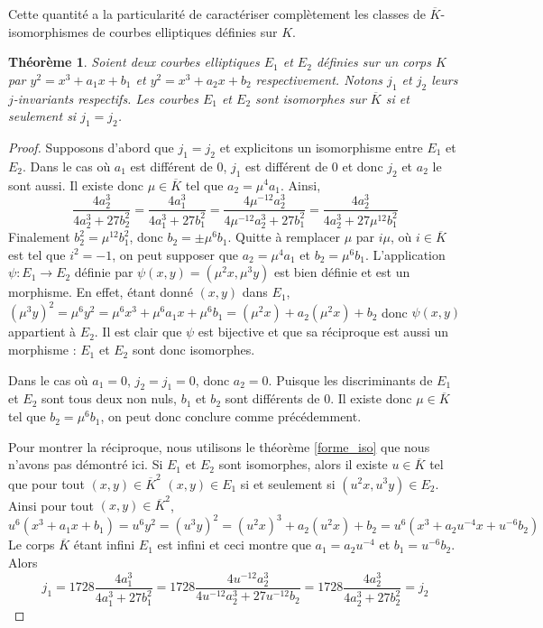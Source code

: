 \documentclass{article}
\theoremstyle{plain}%
\newtheorem{thm}{Théorème}[section]
\theoremstyle{definition}%
\newcommand{\ol}{\overline}
\begin{document}
Cette quantité a la particularité de caractériser complètement les classes de $\ol K$-isomorphismes de courbes elliptiques définies sur $K$.

\begin{thm}
Soient deux courbes elliptiques $E_1$ et $E_2$ définies sur un corps $K$ par $y^2 = x^3 + a_1x+ b_1$ et $y^2 = x^3 + a_2x + b_2$ respectivement. Notons $j_1$ et $j_2$ leurs $j$-invariants respectifs. Les courbes $E_1$ et $E_2$ sont isomorphes sur $\ol K$ si et seulement si $j_1 = j_2$.
\end{thm}

\begin{proof}
  Supposons d'abord que $j_1 = j_2$ et explicitons un isomorphisme entre $E_1$ et $E_2$. Dans le cas où $a_1$ est différent de $0$, $j_1$ est différent de $0$ et donc $j_2$ et $a_2$ le sont aussi. Il existe donc $\mu \in \ol K$ tel que $a_2 = \mu^4 a_1$. Ainsi,
  $$ \frac{4a_2^3}{4a_2^3 +27b_2^2} = \frac{4a_1^3}{4a_1^3+27b_1^2} =\frac{4\mu^{-12}a_2^3}{4\mu^{-12}a_2^3 + 27b_1^2} = \frac{4a_2^3}{4a_2^3+ 27\mu^{12} b_1^2}$$
  Finalement $b_2^2 = \mu^{12}b_1^2$, donc $b_2 = \pm \mu^6 b_1$. Quitte à remplacer $\mu$ par $i\mu$, où $i\in \ol K$ est tel que $i^2 = -1$, on peut supposer que $a_2 = \mu^4 a_1$ et $b_2 = \mu^6 b_1$. L'application $\psi : E_1\to E_2$ définie par $\psi(x, y) = (\mu ^2x, \mu ^3 y)$ est bien définie et est un morphisme. En effet, étant donné $(x, y)$ dans $E_1$, $(\mu^3y)^2 = \mu^6 y^2 = \mu^6 x^3 + \mu^6 a_1 x + \mu^6 b_1 = (\mu ^2 x) + a_2(\mu^2x)+ b_2$ donc $\psi(x, y)$ appartient à $E_2$. Il est clair que $\psi$ est bijective et que sa réciproque est aussi un morphisme : $E_1$ et $E_2$ sont donc isomorphes.

  Dans le cas où $a_1 = 0$, $j_2 = j_1 = 0$, donc $a_2 = 0$. Puisque les discriminants de $E_1$ et $E_2$ sont tous deux non nuls, $b_1$ et $b_2$ sont différents de $0$. Il existe donc $\mu \in \ol K$ tel que $b_2 = \mu^6 b_1$, on peut donc conclure comme précédemment.

  Pour montrer la réciproque, nous utilisons le théorème \ref{forme_iso} que nous n'avons pas démontré ici. Si $E_1$ et $E_2$ sont isomorphes, alors il existe $u\in \ol K$ tel que pour tout $(x, y)\in \ol K ^2$ $(x, y)\in E_1$ si et seulement si $(u^2x, u^3y)\in E_2$. Ainsi pour tout $(x, y)\in \ol K ^2$, $$u^6 (x^3 + a_1 x + b_1) = u^6 y^2 = (u^3y)^2 = (u^2x)^3 + a_2(u^2x) + b_2 = u^6 (x^3 + a_2u^{-4}x + u^{-6}b_2) $$ Le corps $\ol K$ étant infini $E_1$ est infini et ceci montre que $a_1 = a_2u^{-4}$ et $b_1 = u^{-6}b_2$. Alors $$j_1 = 1728\frac{4a_1^3}{4a_1^3 + 27b_1^2} = 1728 \frac{4u^{-12}a_2^3}{4u^{-12}a_2^3 + 27u^{-12}b_2} = 1728 \frac{4a_2^3}{4a_2^3 + 27b_2^2} = j_2$$
\end{proof}
\end{document}
